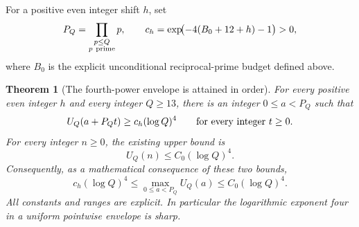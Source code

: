 \documentclass[11pt]{article}
\newtheorem{theorem}{Theorem}[section]
\begin{document}
For a positive even integer shift \(h\), set
\[
 P_Q=\prod_{\substack{p\leq Q\\p\ {\rm prime}}}p,\qquad
 c_h=\exp\!\bigl(-4(B_0+12+h)-1\bigr)>0,
\]
where \(B_0\) is the explicit unconditional reciprocal-prime budget
defined above.

\begin{theorem}[The fourth-power envelope is attained in order]
\label{thm:sharpFourthPowerIntegerPacket}
For every positive even integer \(h\) and every integer \(Q\geq13\),
there is an integer \(0\leq a<P_Q\) such that
\[
       U_Q(a+P_Qt)\geq c_h(\log Q)^4
                       \qquad\hbox{for every integer }t\geq0.
\]
For every integer \(n\geq0\), the existing upper bound is
\[
                         U_Q(n)\leq C_0(\log Q)^4.
\]
Consequently, as a mathematical consequence of these two bounds,
\[
 c_h(\log Q)^4
       \leq\max_{0\leq a<P_Q}U_Q(a)
       \leq C_0(\log Q)^4.
\]
All constants and ranges are explicit. In particular the logarithmic
exponent four in a uniform pointwise envelope is sharp.
\end{theorem}
\end{document}
